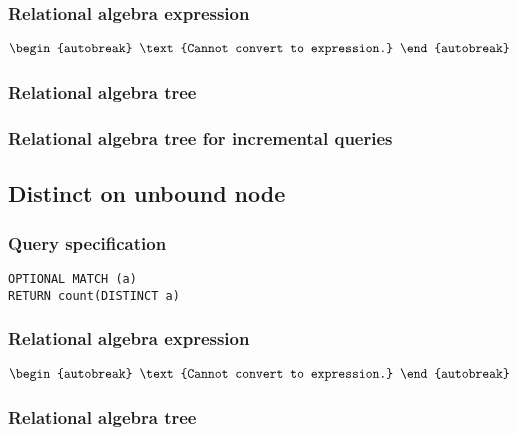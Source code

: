 \subsubsection*{Relational algebra expression}

\begin{align*}
\begin{autobreak}
\text{Cannot convert to expression.}
\end{autobreak}
\end{align*}

\subsubsection*{Relational algebra tree}


\subsubsection*{Relational algebra tree for incremental queries}


\subsection{Distinct on unbound node}

\subsubsection*{Query specification}

\begin{lstlisting}
OPTIONAL MATCH (a)
RETURN count(DISTINCT a)
\end{lstlisting}

\subsubsection*{Relational algebra expression}

\begin{align*}
\begin{autobreak}
\text{Cannot convert to expression.}
\end{autobreak}
\end{align*}

\subsubsection*{Relational algebra tree}

